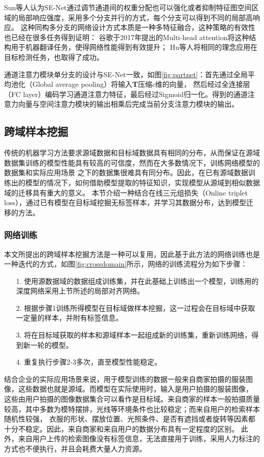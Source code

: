 Sun等人认为SE-Net通过调节通道间的权重分配也可以强化或者抑制特征图空间区域的局部响应强度，采用多个分支并行的方式，每个分支可以得到不同的局部高响应\cite{sun2018multi}。
这种同构多分支的网络设计方式本质是一种多特征融合，这种策略的有效性也已经在很多任务得到证明：
谷歌于2017年提出的Multi-head attention\cite{vaswani2017attention}将这种结构用于机器翻译任务，使得网络性能得到有效提升；
Hu等人将相同的理念应用在目标检测任务\cite{hu2018relation}，也取得了成功。

通道注意力模块单分支的设计与SE-Net一致，如图\ref{fig:partnet}：首先通过全局平均池化（Global average pooling）将输入\textbf{T}压缩$c$维的向量，
然后经过全连接层（FC layer）编码学习通道注意力特征，最后经过Sigmoid归一化。得到的通道注意力向量与空间注意力模块的输出相乘后完成当前分支注意力模块的输出。

\subsection{跨域样本挖掘}
传统的机器学习方法要求源域数据和目标域数据具有相同的分布，从而保证在源域数据集训练的模型性能具有较高的可信度，然而在大多数情况下，训练网络模型的数据集和实际应用场景
之下的数据集很难具有同分布。因此，在已有源域数据训练出的模型的情况下，如何借助模型提取的特征知识，实现模型从源域到相似数据域的迁移具有重大的意义。
本节介绍一种结合在线三元组损失（Online triplet loss），通过已有模型在目标域挖掘无标签样本，并学习其数据分布，达到模型迁移的方法。

\subsubsection{网络训练}

本文所提出的跨域样本挖掘方法是一种可以复用，因此基于此方法的网络训练也是一种迭代的方式，如图\ref{fig:crossdomain}所示，网络的训练流程分为如下步骤：
\begin{itemize}
  \item[1.] 使用源数据域的数据组成训练集，并在此基础上训练出一个模型，训练用的深度网络采用上节所述的局部对齐网络。
  \item[2.] 根据步骤1训练所得模型在目标域做样本挖掘，这一过程会在目标域中获取一定量的样本，并附有标签信息。
  \item[3.] 将在目标域获取的样本和源域样本一起组成新的训练集，重新训练网络，得到新一轮的模型。
  \item[4.] 重复执行步骤2-3多次，直至模型性能稳定。
\end{itemize}

结合企业的实际应用场景来说，用于模型训练的数据一般来自商家拍摄的服装图像，这些数据也就是源域。而模型在实际使用时，输入是用户拍摄的服装图像，
这些由用户拍摄的图像数据集合可以看作是目标域。来自商家的样本一般拍摄质量较高，其中多数为模特摆排，光线等环境条件也比较稳定；而来自用户的检索样本随机性较强，
衣服的形状、摆放位置、光照条件、是否有遮挡或者旋转等因素都十分不稳定。因此，来自商家和来自用户的数据分布具有一定程度的区别。
此外，来自用户上传的检索图像没有标签信息，无法直接用于训练，采用人力标注的方式也不便执行，并且会耗费大量人力资源。

